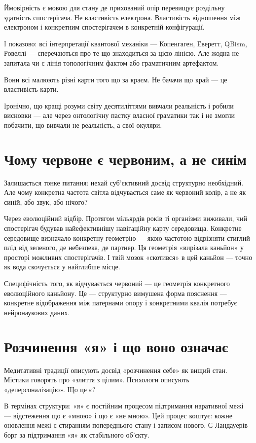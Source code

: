 \documentclass[12pt, a4paper, openany]{book}
\begin{document}
Ймовірність є мовою для стану де прихований опір перевищує роздільну здатність спостерігача. Не властивість електрона. Властивість відношення між електроном і конкретним спостерігачем в конкретній конфігурації.

І показово: всі інтерпретації квантової механіки --- Копенгаген, Еверетт, QBism, Ровеллі --- сперечаються про те що знаходиться за цією лінією. Але жодна не запитала чи є лінія топологічним фактом або граматичним артефактом.

Вони всі малюють різні карти того що за краєм. Не бачачи що край --- це властивість карти.

Іронічно, що кращі розуми світу десятиліттями вивчали реальність і робили висновки --- але через онтологічну пастку власної граматики так і не змогли побачити, що вивчали не реальність, а свої окуляри.

\section{Чому червоне є червоним, а не синім}

Залишається тонке питання: нехай суб'єктивний досвід структурно необхідний. Але чому конкретна частота світла відчувається саме як червоний колір, а не як синій, або звук, або нічого?

Через еволюційний відбір. Протягом мільярдів років ті організми виживали, чий спостерігач будував найефективнішу навігаційну карту середовища. Конкретне середовище визначало конкретну геометрію --- якою частотою відрізняти стиглий плід від зеленого, де небезпека, де партнер. Ця геометрія «вирізала каньйон» у просторі можливих спостерігачів. І твій мозок «скотився» в цей каньйон --- точно як вода скочується у найглибше місце.

Специфічність того, як відчувається червоний --- це геометрія конкретного еволюційного каньйону. Це — структурно вимушена форма пояснення — конкретне відображення між патернами опору і конкретними квалія потребує нейронаукових даних.

\section{Розчинення «я» і що воно означає}

Медитативні традиції описують досвід «розчинення себе» як вищий стан. Містики говорять про «злиття з цілим». Психологи описують «деперсоналізацію». Що це є?

В термінах структури: «я» є постійним процесом підтримання наративної межі — відстеження що є «мною» і що є «не мною». Цей процес коштує: кожне оновлення межі є стиранням попереднього стану і записом нового. Є Ландауерів борг за підтримання «я» як стабільного об'єкту.
\end{document}
